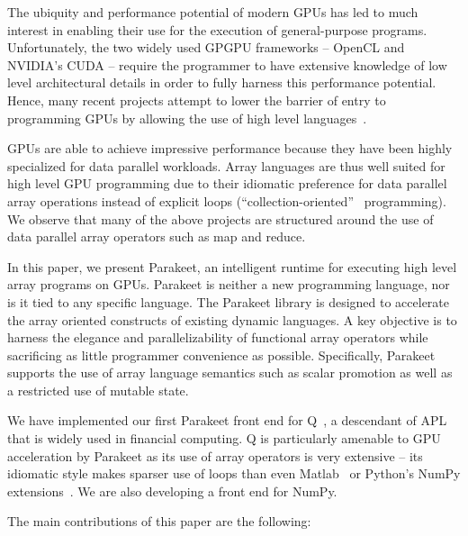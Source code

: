 \documentclass[preprint]{sigplanconf}
\begin{document}
The ubiquity and performance potential of modern GPUs has led to much interest in enabling their use for the execution of general-purpose programs. Unfortunately, the two widely used GPGPU frameworks -- OpenCL \cite{Muns10} and NVIDIA's CUDA \cite{NvidCU} -- require the programmer to have extensive knowledge of low level architectural details in order to fully harness this performance potential. Hence, many recent projects attempt to lower the barrier of entry to programming GPUs by allowing the use of high level languages~\cite{Cata11,Chaf11,Chak11,Main10,Sven08,Tard06}.

GPUs are able to achieve impressive performance because they have been highly specialized for data parallel workloads.  Array languages are thus well suited for high level GPU programming due to their idiomatic preference for data parallel array operations instead of explicit loops (``collection-oriented''~\cite{Sip91} programming). We observe that many of the above projects are structured around the use of data parallel array operators such as map and reduce.

In this paper, we present Parakeet, an intelligent runtime for executing high level array programs on GPUs. Parakeet is neither a new programming language, nor is it tied to any specific language. The Parakeet library is designed to accelerate the array oriented constructs of existing dynamic languages. A key objective is to harness the elegance and parallelizability of functional array operators while sacrificing as little programmer convenience as possible.  Specifically, Parakeet supports the use of array language semantics such as scalar promotion as well as a restricted use of mutable state.

We have implemented our first Parakeet front end for Q~\cite{Borr08}, a descendant of APL that is widely used in financial computing. Q is particularly amenable to GPU acceleration by Parakeet as its use of array operators is very extensive -- its idiomatic style makes sparser use of loops than even Matlab~\cite{Moler80} or Python's NumPy extensions~\cite{Oliphant07}. We are also developing a front end for NumPy.

The main contributions of this paper are the following:
\end{document}
